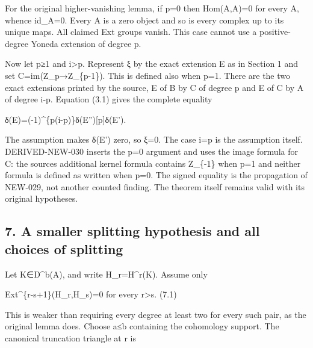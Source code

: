 \documentclass[11pt]{article}
\begin{document}
For the original higher-vanishing lemma,\allowbreak{} if p\allowbreak{}=0 then Hom(A,\allowbreak{}A)\allowbreak{}\allowbreak{}=0 for every A,\allowbreak{} whence id\_\allowbreak{}A\allowbreak{}=0. Every A is a zero object and so is every complex up to its unique maps. All claimed Ext groups vanish. This case cannot use a positive-degree Yoneda extension of degree p.

Now let p≥1 and i\textgreater p. Represent ξ by the exact extension E as in Section 1 and set C\allowbreak{}=im(Z\_\allowbreak{}p\allowbreak{}→Z\_\allowbreak{}\{p-1\})\allowbreak{}. This is defined also when p\allowbreak{}=1. There are the two exact extensions printed by the source,\allowbreak{} E\textquotesingle{} of B by C of degree p and E\textquotesingle\textquotesingle{} of C by A of degree i-p. Equation (3.1)\allowbreak{} gives the complete equality

δ(E)\allowbreak{}\allowbreak{}=(-1)\allowbreak{}\textasciicircum{}\{p(i-p)\allowbreak{}\}δ(E'')\allowbreak{}[p]\allowbreak{}δ(E')\allowbreak{}.

The assumption makes δ(E')\allowbreak{} zero,\allowbreak{} so ξ\allowbreak{}=0. The case i\allowbreak{}=p is the assumption itself. DERIVED-NEW-030 inserts the p\allowbreak{}=0 argument and uses the image formula for C:\allowbreak{} the source\textquotesingle s additional kernel formula contains Z\_\allowbreak{}\{-1\} when p\allowbreak{}=1 and neither formula is defined as written when p\allowbreak{}=0. The signed equality is the propagation of NEW-029,\allowbreak{} not another counted finding. The theorem itself remains valid with its original hypotheses.

\subsection{7. A smaller splitting hypothesis and all choices of splitting}\label{proofs-8774-9196-a-smaller-splitting-hypothesis-and-all-choices-of-splitting}

Let K\allowbreak{}∈D\textasciicircum{}b(A)\allowbreak{},\allowbreak{} and write H\_\allowbreak{}r\allowbreak{}=H\textasciicircum{}r(K)\allowbreak{}. Assume only

Ext\textasciicircum{}\{r-s\allowbreak{}+1\}(H\_\allowbreak{}r,\allowbreak{}H\_\allowbreak{}s)\allowbreak{}\allowbreak{}=0 for every r\textgreater s. (7.1)\allowbreak{}

This is weaker than requiring every degree at least two for every such pair,\allowbreak{} as the original lemma does. Choose a≤b containing the cohomology support. The canonical truncation triangle at r is
\end{document}
